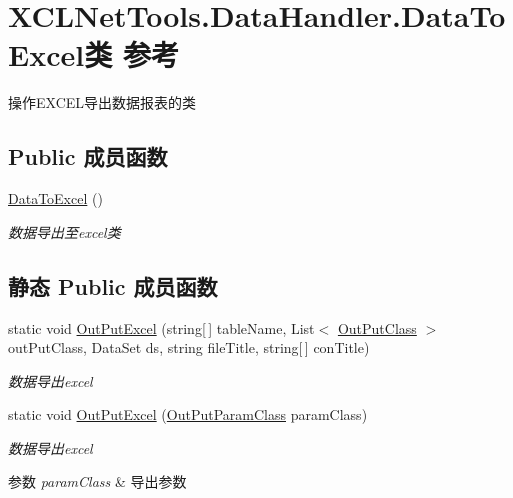 \hypertarget{class_x_c_l_net_tools_1_1_data_handler_1_1_data_to_excel}{\section{X\-C\-L\-Net\-Tools.\-Data\-Handler.\-Data\-To\-Excel类 参考}
\label{class_x_c_l_net_tools_1_1_data_handler_1_1_data_to_excel}
}


操作\-E\-X\-C\-E\-L导出数据报表的类  


\subsection*{Public 成员函数}
\begin{DoxyCompactItemize}
\item 
\hyperlink{class_x_c_l_net_tools_1_1_data_handler_1_1_data_to_excel_af9078e9ec28e23aac0054ab3c16cc0a7}{Data\-To\-Excel} ()
\begin{DoxyCompactList}\small\item\em 数据导出至excel类 \end{DoxyCompactList}\end{DoxyCompactItemize}
\subsection*{静态 Public 成员函数}
\begin{DoxyCompactItemize}
\item 
static void \hyperlink{class_x_c_l_net_tools_1_1_data_handler_1_1_data_to_excel_ab2355fae5c2f8c39b72472b59dee898b}{Out\-Put\-Excel} (string\mbox{[}$\,$\mbox{]} table\-Name, List$<$ \hyperlink{class_x_c_l_net_tools_1_1_data_handler_1_1_out_put_class}{Out\-Put\-Class} $>$ out\-Put\-Class, Data\-Set ds, string file\-Title, string\mbox{[}$\,$\mbox{]} con\-Title)
\begin{DoxyCompactList}\small\item\em 数据导出excel \end{DoxyCompactList}\item 
static void \hyperlink{class_x_c_l_net_tools_1_1_data_handler_1_1_data_to_excel_ae9071c256d304ff488e4f603aac980ad}{Out\-Put\-Excel} (\hyperlink{class_x_c_l_net_tools_1_1_data_handler_1_1_out_put_param_class}{Out\-Put\-Param\-Class} param\-Class)
\begin{DoxyCompactList}\small\item\em 数据导出excel 
\begin{DoxyParams}{参数}
{\em param\-Class} & 导出参数\\
\hline
\end{DoxyParams}
\end{DoxyCompactList}\end{DoxyCompactItemize}


